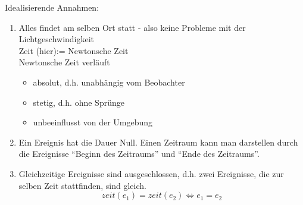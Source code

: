 \documentclass[a4paper,12pt]{scrartcl}
\begin{document}
Idealisierende Annahmen:
\begin{enumerate}
 \item Alles findet am selben Ort statt - also keine Probleme mit der Lichtgeschwindigkeit\\
 Zeit (hier):= Newtonsche Zeit\\
 Newtonsche Zeit verläuft
 \begin{itemize}
  \item absolut, d.h. unabhängig vom Beobachter
  \item stetig, d.h. ohne Sprünge
  \item unbeeinflusst von der Umgebung
 \end{itemize}
 \item Ein Ereignis hat die Dauer Null. Einen Zeitraum kann man darstellen durch die Ereignisse "`Beginn des Zeitraums"' und "`Ende des Zeitraums"'.
 \item Gleichzeitige Ereignisse sind ausgeschlossen, d.h. zwei Ereignisse, die zur selben Zeit stattfinden, sind gleich.
 $$zeit(e_1) = zeit(e_2) \Leftrightarrow e_1=e_2$$
 
\end{enumerate}
\end{document}
